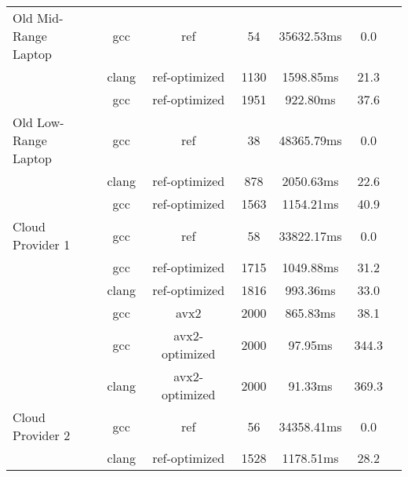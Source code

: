 \begin{table}
\begin{tabularx}{\linewidth}{l c c c c c c}
           \midrule
        \multirowcell{3}{Old Mid-Range\\ Laptop} &                  gcc &                  ref &                   54 &           35632.53ms &                  0.0\\
        &                clang &        ref-optimized &                 1130 &            1598.85ms &                 21.3\\
        &                  gcc &        ref-optimized &                 1951 &             922.80ms &                 37.6\\
        \midrule
        \multirowcell{3}{Old Low-Range\\ Laptop} &                  gcc &                  ref &                   38 &           48365.79ms &                  0.0\\
        &                clang &        ref-optimized &                  878 &            2050.63ms &                 22.6\\
        &                  gcc &        ref-optimized &                 1563 &            1154.21ms &                 40.9\\
            \midrule
            \multirowcell{6}{Cloud\\ Provider 1} &                  gcc &                  ref &                   58 &           33822.17ms &                  0.0\\
            &                  gcc &        ref-optimized &                 1715 &            1049.88ms &                 31.2\\
            &                clang &        ref-optimized &                 1816 &             993.36ms &                 33.0\\
            &                  gcc &                 avx2 &                 2000 &             865.83ms &                 38.1\\
            &                  gcc &       avx2-optimized &                 2000 &              97.95ms &                344.3\\
            &                clang &       avx2-optimized &                 2000 &              91.33ms &                369.3\\
            \midrule
            \multirowcell{6}{Cloud\\ Provider 2} &                  gcc &                  ref &                   56 &           34358.41ms &                  0.0\\
             &                clang &        ref-optimized &                 1528 &            1178.51ms &                 28.2\\

\end{tabularx}
\end{table}
